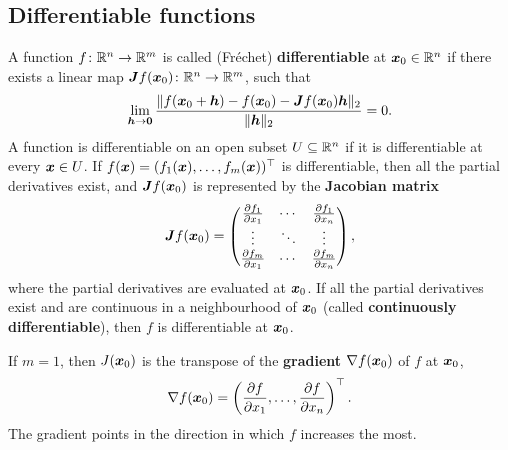 \documentclass[11pt,a4paper]{memoir}
\begin{document}
\subsection{Differentiable functions}
A function $f\colon \mathbb{R}^n\to \mathbb{R}^m$ is called (Fr\'echet) \textbf{differentiable} at $\bm{x}_0\in \mathbb{R}^n$ if there exists a linear map $\bm{J}f(\bm{x}_0)\colon \mathbb{R}^n \to \mathbb{R}^m$, such that
\begin{equation*}
 \lim_{\bm{h}\to \bm{0}}\frac{\Vert {f(\bm{x}_0+\bm{h})-f(\bm{x}_0)-\bm{J}f(\bm{x}_0)\bm{h}}\Vert_2}{\Vert {\bm{h}}\Vert_2}=0.
\end{equation*}
A function is differentiable on an open subset $U\subseteq \mathbb{R}^n$ if it is differentiable at every $\bm{x}\in U$.
If $f(\bm{x})=(f_1(\bm{x}),\dots,f_m(\bm{x}))^{\top}$ is differentiable, then all the partial derivatives exist, and $\bm{J}f(\bm{x}_0)$ is represented by the \textbf{Jacobian matrix}
\begin{equation*}
 \bm{J}f(\bm{x}_0) = \begin{pmatrix}
            \frac{\partial f_1}{\partial x_1} & \cdots & \frac{\partial f_1}{\partial x_n}\\
            \vdots & \ddots & \vdots\\
            \frac{\partial f_m}{\partial x_1} & \cdots & \frac{\partial f_m}{\partial x_n}
           \end{pmatrix},
\end{equation*}
where the partial derivatives are evaluated at $\bm{x}_0$. If all the partial derivatives exist and are continuous in a neighbourhood of $\bm{x}_0$ (called \textbf{continuously differentiable}), then $f$ is differentiable at $\bm{x}_0$.

If $m=1$, then $J(\bm{x}_0)$ is the transpose of the \textbf{gradient} $\nabla f(\bm{x}_0)$ of $f$ at $\bm{x}_0$,
\begin{equation*}
 \nabla f(\bm{x}_0) = \left(\frac{\partial f}{\partial x_1},\dots,\frac{\partial f}{\partial x_n}\right)^{\top}.
\end{equation*}
The gradient points in the direction in which $f$ increases the most. 
\end{document}
